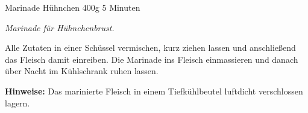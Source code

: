 \begin{recipe}{Marinade Hühnchen} {400g} {5 Minuten}

  \freeform
  \textit{Marinade für Hühnchenbrust.}


  Alle Zutaten in einer Schüssel vermischen, kurz ziehen lassen und anschließend das Fleisch damit einreiben.
  Die Marinade ins Fleisch einmassieren und danach über Nacht im Kühlschrank ruhen lassen.

  \freeform
  \hrulefill

  \freeform
  \textbf{Hinweise:}
  Das marinierte Fleisch in einem Tiefkühlbeutel luftdicht verschlossen lagern.

\end{recipe}
